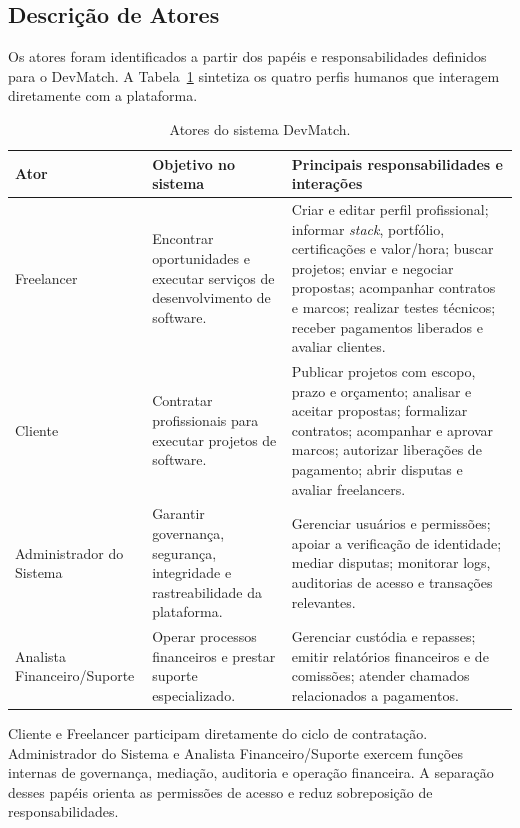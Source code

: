 \subsection{Descrição de Atores}
\label{sec:atores}

Os atores foram identificados a partir dos papéis e responsabilidades definidos para o DevMatch. A Tabela~\ref{tab:atores} sintetiza os quatro perfis humanos que interagem diretamente com a plataforma.

\begin{table}[!htbp]
\centering
\caption{Atores do sistema DevMatch.}
\label{tab:atores}
\small
\begin{tabularx}{\textwidth}{@{}p{3.0cm}p{4.2cm}X@{}}
\toprule
\textbf{Ator} & \textbf{Objetivo no sistema} & \textbf{Principais responsabilidades e interações} \\
\midrule
Freelancer & Encontrar oportunidades e executar serviços de desenvolvimento de software. & Criar e editar perfil profissional; informar \textit{stack}, portfólio, certificações e valor/hora; buscar projetos; enviar e negociar propostas; acompanhar contratos e marcos; realizar testes técnicos; receber pagamentos liberados e avaliar clientes. \\
Cliente & Contratar profissionais para executar projetos de software. & Publicar projetos com escopo, prazo e orçamento; analisar e aceitar propostas; formalizar contratos; acompanhar e aprovar marcos; autorizar liberações de pagamento; abrir disputas e avaliar freelancers. \\
Administrador do Sistema & Garantir governança, segurança, integridade e rastreabilidade da plataforma. & Gerenciar usuários e permissões; apoiar a verificação de identidade; mediar disputas; monitorar logs, auditorias de acesso e transações relevantes. \\
Analista Financeiro/Suporte & Operar processos financeiros e prestar suporte especializado. & Gerenciar custódia e repasses; emitir relatórios financeiros e de comissões; atender chamados relacionados a pagamentos. \\
\bottomrule
\end{tabularx}
\end{table}

Cliente e Freelancer participam diretamente do ciclo de contratação. Administrador do Sistema e Analista Financeiro/Suporte exercem funções internas de governança, mediação, auditoria e operação financeira. A separação desses papéis orienta as permissões de acesso e reduz sobreposição de responsabilidades.

